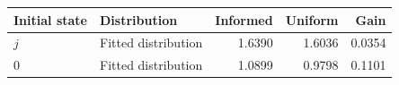 \begin{tabular}{llrrr}\toprule
Initial state & Distribution & Informed & Uniform & Gain\\\midrule
$j$ & Fitted distribution & 1.6390 & 1.6036 & 0.0354 \\
$0$ & Fitted distribution & 1.0899 & 0.9798 & 0.1101 \\
\bottomrule\end{tabular}
